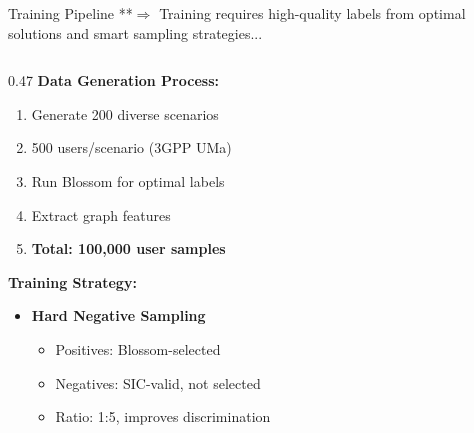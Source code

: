\documentclass[aspectratio=169]{beamer}
\begin{document}
\begin{frame}{Training Pipeline}
    \vspace{-0.25cm}
    \small \textcolor{iiitblue}{**$\Rightarrow$ Training requires high-quality labels from optimal solutions and smart sampling strategies...}
    
    
    
    \begin{columns}[T]
        \begin{column}{0.47\textwidth}
            \textbf{Data Generation Process:}
            \begin{enumerate}\itemsep0em
                \item Generate 200 diverse scenarios
                \item 500 users/scenario (3GPP UMa)
                \item Run Blossom for optimal labels
                \item Extract graph features
                \item \textbf{Total: 100,000 user samples}
            \end{enumerate}
            
            
            
            \textbf{Training Strategy:}
            \begin{itemize}\itemsep0.55em
                \item \textbf{Hard Negative Sampling}
                \begin{itemize}\itemsep0em
                    \item Positives: Blossom-selected
                    \item Negatives: SIC-valid, not selected
                    \item Ratio: 1:5, improves discrimination
                \end{itemize}
                

\end{itemize}
\end{column}
\end{columns}
\end{frame}
\end{document}
